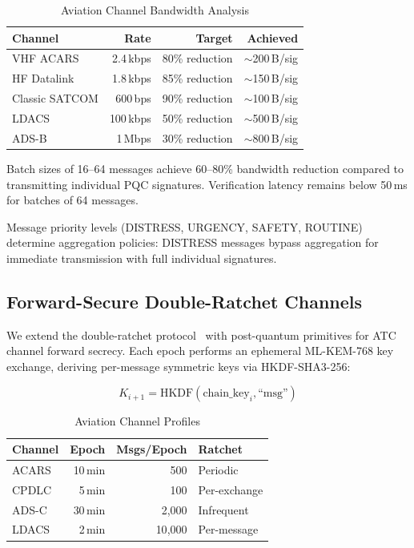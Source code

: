\documentclass[conference,10pt]{IEEEtran}
\newcommand{\mlkem}{\textsf{ML-KEM}}
\begin{document}
\begin{table}[t]
\centering
\caption{Aviation Channel Bandwidth Analysis}
\label{tab:aviation}
\begin{tabular}{lrrr}
\toprule
\textbf{Channel} & \textbf{Rate} & \textbf{Target} & \textbf{Achieved} \\
\midrule
VHF ACARS & 2.4\,kbps & 80\% reduction & $\sim$200\,B/sig \\
HF Datalink & 1.8\,kbps & 85\% reduction & $\sim$150\,B/sig \\
Classic SATCOM & 600\,bps & 90\% reduction & $\sim$100\,B/sig \\
LDACS & 100\,kbps & 50\% reduction & $\sim$500\,B/sig \\
ADS-B & 1\,Mbps & 30\% reduction & $\sim$800\,B/sig \\
\bottomrule
\end{tabular}
\end{table}

Batch sizes of 16--64 messages achieve 60--80\% bandwidth reduction compared to transmitting individual PQC signatures. Verification latency remains below 50\,ms for batches of 64 messages.

Message priority levels (DISTRESS, URGENCY, SAFETY, ROUTINE) determine aggregation policies: DISTRESS messages bypass aggregation for immediate transmission with full individual signatures.

\subsection{Forward-Secure Double-Ratchet Channels}

We extend the double-ratchet protocol~\cite{signal_ratchet} with post-quantum primitives for ATC channel forward secrecy. Each epoch performs an ephemeral \mlkem{}-768 key exchange, deriving per-message symmetric keys via HKDF-SHA3-256:

\begin{equation}
    K_{i+1} = \text{HKDF}(\text{chain\_key}_i, \text{``msg''})
\end{equation}

\begin{table}[t]
\centering
\caption{Aviation Channel Profiles}
\label{tab:channels}
\begin{tabular}{lrrl}
\toprule
\textbf{Channel} & \textbf{Epoch} & \textbf{Msgs/Epoch} & \textbf{Ratchet} \\
\midrule
ACARS & 10\,min & 500 & Periodic \\
CPDLC & 5\,min & 100 & Per-exchange \\
ADS-C & 30\,min & 2{,}000 & Infrequent \\
LDACS & 2\,min & 10{,}000 & Per-message \\
\bottomrule
\end{tabular}
\end{table}
\end{document}
